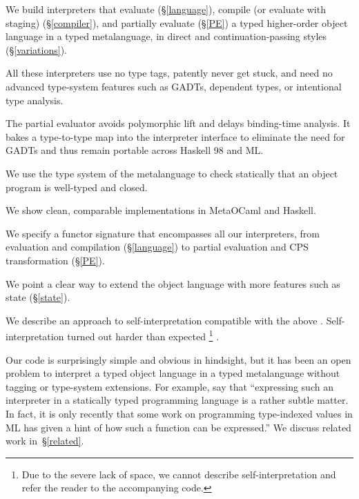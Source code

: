 \begin{enumerate*}
\item We build interpreters that evaluate (\S\ref{language}),
    compile (or evaluate with staging) (\S\ref{compiler}), and partially evaluate (\S\ref{PE}) a typed higher-order object language
   in a typed metalanguage, in direct and continuation\hyp passing styles
   (\S\ref{variations}).
\item All these interpreters use no type tags, patently never get stuck,
    and need no advanced type-system features such as GADTs, dependent types,
    or intentional type analysis.
\item The partial evaluator avoids polymorphic lift and delays binding-time
    analysis.  It bakes a type-to-type map into the interpreter
    interface to eliminate the need for GADTs and thus remain portable
    across Haskell 98 and ML.
\item We use the type system of the metalanguage
    to check statically that an object program is well-typed and closed.
\item We show clean, comparable implementations in MetaOCaml and Haskell.
\item We specify a functor signature that encompasses all our interpreters, from
    evaluation and compilation (\S\ref{language}) to partial evaluation and CPS transformation (\S\ref{PE}).
\item We point a clear way to extend the object language with more features
    such as state (\S\ref{state}).
\item We describe an approach to self\hyp interpretation compatible with the
  above%
.  Self\hyp interpretation turned out
  harder than expected%
\footnote{Due to the severe lack of space, we cannot describe
self-interpretation and refer the reader to the accompanying code.}%
.
\end{enumerate*}
Our code is surprisingly simple and obvious in hindsight, but
it has been an open problem to
interpret a typed object language in a typed metalanguage without
tagging or type\hyp system extensions.  For example, \citet{taha-tag}
say that ``expressing such an interpreter in a statically typed
programming language is a rather subtle matter. In fact, it is only
recently that some work on programming type-indexed values in ML
\cite{yang-encoding} has given a hint of how such a function can be
expressed.''  We discuss related work in~\S\ref{related}.

